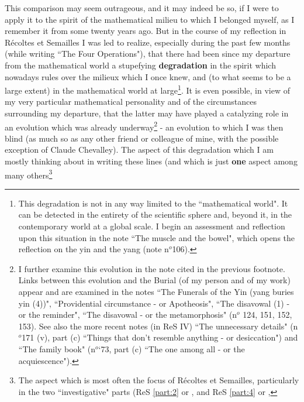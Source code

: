 This comparison may seem outrageous, and it may indeed be so, if I were to apply it to the spirit of the mathematical milieu to which I belonged myself, as I remember it from some twenty years ago. But in the course of my reflection in R\'ecoltes et Semailles I was led to realize, especially during the past few months (while writing ``The Four Operations"), that there had been since my departure from the mathematical world a stupefying \textbf{degradation} in the spirit which nowadays rules over the milieux which I once knew, and (to what seems to be a large extent) in the mathematical world at large\footnote{This degradation is not in any way limited to the ``mathematical world". It can be detected in the entirety of the scientific sphere and, beyond it, in the contemporary world at a global scale. I begin an assessment and reflection upon this situation in the note ``The muscle and the bowel", which opens the reflection on the yin and the yang (note n$^o$106).
}. It is even possible, in view of my very particular mathematical personality and of the circumstances surrounding my departure, that the latter may have played a catalyzing role in an evolution which was already underway\footnote{I further examine this evolution in the note cited in the previous footnote. Links between this evolution and the Burial (of my person and of my work) appear and are examined in the notes ``The Funerals of the Yin (yang buries yin (4))", ``Providential circumstance - or Apotheosis", ``The disavowal (1) - or the reminder", ``The disavowal - or the metamorphosis" (n$^o$ 124, 151, 152, 153). See also the more recent notes (in ReS IV) ``The unnecessary details" (n$^o$171 (v), part (c) ``Things that don't resemble anything - or desiccation") and ``The family book" (n$^o$`73, part (c) ``The one among all - or the acquiescence").
} - an evolution to which I was then blind (as much so as any other friend or colleague of mine, with the possible exception of Claude Chevalley). The aspect of this degradation which I am mostly thinking about in writing these lines (and which is just \textbf{one} aspect among many others\footnote{The aspect which is most often the focus of R\'ecoltes et Semailles, particularly in the two ``investigative" parts 
(ReS \ref{part:2} or , and ReS \ref{part:4} or ,
}

